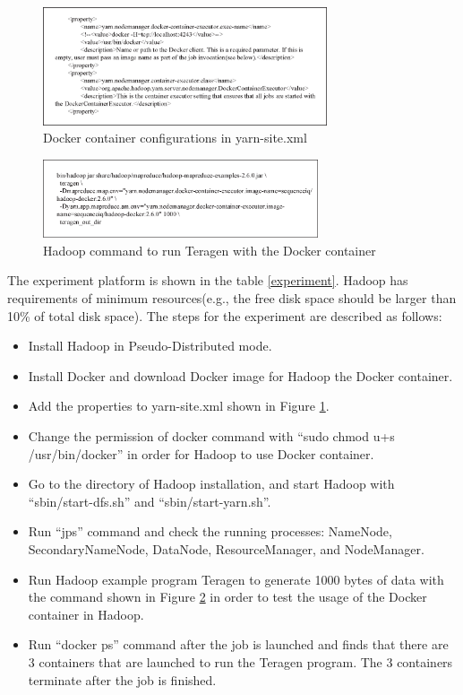 \begin{figure}[h]
  \centering
  \includegraphics[width=3.3in]{figs/code.eps}
  \caption{Docker container configurations in yarn-site.xml}
  \label{fig:CodeOverview}
\end{figure}
\begin{figure}[h]
  \centering
  \includegraphics[width=3.2in]{figs/command.eps}
  \caption{Hadoop command to run Teragen with the Docker container}
  \label{fig:Commandoverview}
\end{figure}
The experiment platform is shown in the table \ref{experiment}. Hadoop has requirements of minimum resources(e.g., the free disk space should be larger than 10\% of total disk space). The steps for the experiment are described as follows:
\begin{itemize}
\item {Install Hadoop in Pseudo-Distributed mode.}
\item {Install Docker and download Docker image for Hadoop the Docker container.}
\item {Add the properties to yarn-site.xml shown in Figure \ref{fig:CodeOverview}.}
\item {Change the permission of docker command with ``sudo chmod u+s /usr/bin/docker” in order for Hadoop to use Docker container.}
\item {Go to the directory of Hadoop installation, and start Hadoop with ``sbin/start-dfs.sh” and ``sbin/start-yarn.sh”.}
\item {Run ``jps” command and check the running processes: NameNode, SecondaryNameNode, DataNode, ResourceManager, and NodeManager.}
\item {Run Hadoop example program Teragen to generate 1000 bytes of data with the command shown in Figure \ref{fig:Commandoverview} in order to test the usage of the Docker container in Hadoop.}
\item {Run ``docker ps” command after the job is launched and finds that there are 3 containers that are launched to run the Teragen program. The 3 containers terminate after the job is finished.}
\end{itemize}

